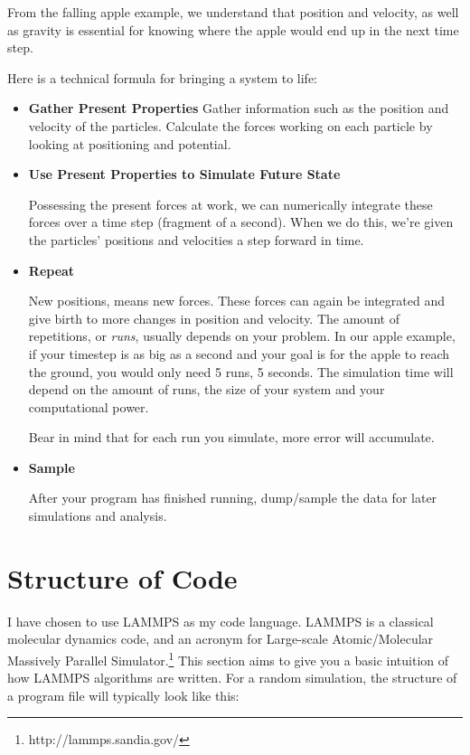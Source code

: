 \documentclass[10pt, a4paper]{report}
\begin{document}
From the falling apple example, we understand that position and velocity, as well as gravity is essential for knowing where 
the apple would end up in the next time step.

Here is a technical formula for bringing a system to life:
\begin{itemize}
 \item {\bf{Gather Present Properties}}
Gather information such as the position and velocity of the particles.
Calculate the forces working on each particle by looking at positioning and potential.
 \item {\bf{Use Present Properties to Simulate Future State}}
 
Possessing the present forces at work, we can numerically integrate these forces over a time step 
(fragment of a second).
When we do this, we're given the particles' positions and velocities a step forward in time.
 \item {\bf{Repeat}}

 New positions, means new forces. These forces can again be integrated and give birth to more changes in position and velocity.
 The amount of repetitions, or \emph{runs}, usually depends on your problem. In our apple example, if your timestep is as big as 
 a second and your goal is for the apple to reach the ground, you would only need 5 runs, 5 seconds.
 The simulation time will depend on the amount of runs, the size of your system and your computational power.
 
 Bear in mind that for each run you simulate, more error will accumulate.

\item {\bf{Sample}}

After your program has finished running, dump/sample the data for later simulations and analysis.
\end{itemize}

\section*{Structure of Code}
I have chosen to use LAMMPS as my code language.
LAMMPS is a classical molecular dynamics code, and an acronym for Large-scale Atomic/Molecular Massively Parallel Simulator.\footnote{http://lammps.sandia.gov/}
This section aims to give you a basic intuition of how LAMMPS algorithms are written.
For a random simulation, the structure of a program file will typically look like this:
\end{document}

